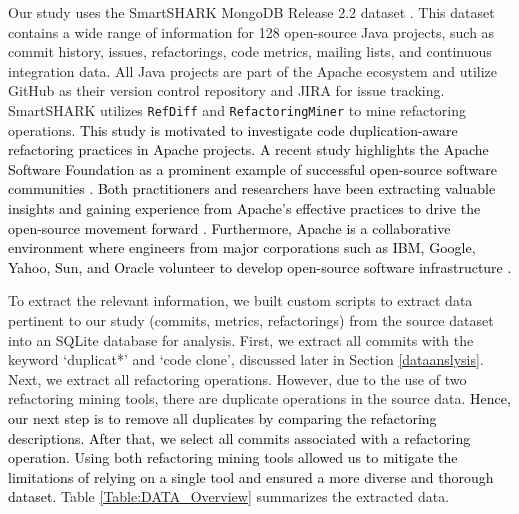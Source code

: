 Our study uses the SmartSHARK MongoDB Release 2.2 dataset  \citep{trautsch2021msr}. This dataset contains a wide range of information for 128 open-source Java projects, such as commit history, issues, refactorings, code metrics, mailing lists, and continuous integration data. All Java projects are part of the Apache ecosystem and utilize GitHub as their version control repository and JIRA for issue tracking. SmartSHARK utilizes \texttt{RefDiff} \citep{silva2017refdiff} and \texttt{RefactoringMiner} \citep{tsantalis2018accurate} to mine refactoring operations. \textcolor{black}{This study is motivated to investigate code duplication-aware refactoring practices in Apache projects. A recent study \citep{xiao2024empirical} highlights the Apache Software Foundation as a prominent example of successful open-source software communities \citep{mockus2002two,mockus2000case,crowston2006assessing}. Both practitioners and researchers have been extracting valuable insights and gaining experience from Apache's effective practices to drive the open-source movement forward \citep{rigby2008open,duenas2007apache,weiss2006evolution}. Furthermore, Apache is a collaborative environment where engineers from major corporations such as IBM, Google, Yahoo, Sun, and Oracle volunteer to develop open-source software infrastructure \citep{severance2012apache}.} 


To extract the relevant information, we built custom scripts to extract data pertinent to our study (\ie commits, metrics, refactorings) from
the source dataset into an SQLite database for analysis. First, we extract all commits with the keyword `duplicat*' and `code clone', discussed later in Section \ref{dataanslysis}. Next,
we extract all refactoring operations. However, due to the use of two refactoring mining tools, there are duplicate operations in the source data. \textcolor{black}{Hence, our next step is to remove all duplicates by comparing the refactoring descriptions. After that, we select all
commits associated with a refactoring operation. Using both refactoring mining tools allowed us to mitigate the limitations of relying on a single tool and ensured a more diverse and thorough dataset.} Table \ref{Table:DATA_Overview} summarizes the extracted data.




